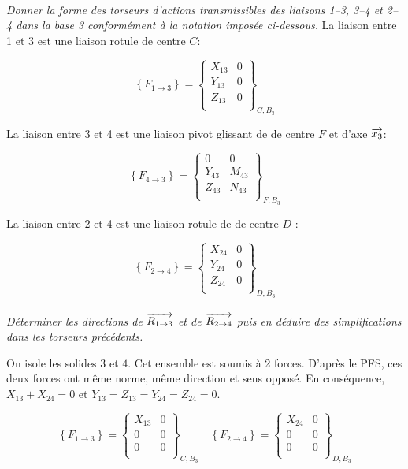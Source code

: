 \documentclass[10pt,oneside]{article}
\begin{document}
\paragraph{}
\textit{Donner la forme des torseurs d'actions transmissibles des liaisons 1--3, 3--4 et 2--4 dans la base 3 conformément à la notation imposée ci-dessous.}
La liaison entre 1 et 3 est une liaison rotule de centre $C$: 

$$
\left\{
F_{1 \rightarrow 3} 
\right\}=
\left\{
\begin{array}{cc}
X_{13} & 0 \\
Y_{13} & 0 \\
Z_{13} & 0 \\
\end{array}
\right\}_{C,B_3}
$$

La liaison entre 3 et 4 est une liaison pivot glissant de de centre $F$ et d'axe $\overrightarrow{x_3}$: 

$$
\left\{
F_{4 \rightarrow 3} 
\right\}=
\left\{
\begin{array}{cc}
0 & 0 \\
Y_{43} & M_{43} \\
Z_{43} & N_{43} \\
\end{array}
\right\}_{F,B_3}
$$

La liaison entre 2 et 4 est une liaison rotule de de centre $D$ : 

$$
\left\{
F_{2 \rightarrow 4} 
\right\}=
\left\{
\begin{array}{cc}
X_{24} & 0 \\
Y_{24} & 0 \\
Z_{24} & 0 \\
\end{array}
\right\}_{D,B_3}
$$
\paragraph{}
\textit{Déterminer les directions de $\overrightarrow{R_{1\rightarrow 3}}$ et de $\overrightarrow{R_{2\rightarrow 4}}$ puis en déduire des simplifications dans les torseurs précédents.}

On isole les solides $3$ et $4$. Cet ensemble est soumis à 2 forces. D'après le PFS, ces deux forces ont même norme, même direction et sens opposé. En conséquence, $X_{13}+X_{24}=0$ et $Y_{13}=Z_{13}=Y_{24}=Z_{24}=0$.

$$
\left\{
F_{1 \rightarrow 3} 
\right\}=
\left\{
\begin{array}{cc}
X_{13} & 0 \\
0 & 0 \\
0 & 0 \\
\end{array}
\right\}_{C,B_3}
\quad 
\left\{
F_{2 \rightarrow 4} 
\right\}=
\left\{
\begin{array}{cc}
X_{24} & 0 \\
0 & 0 \\
0 & 0 \\
\end{array}
\right\}_{D,B_3}
$$
\end{document}
